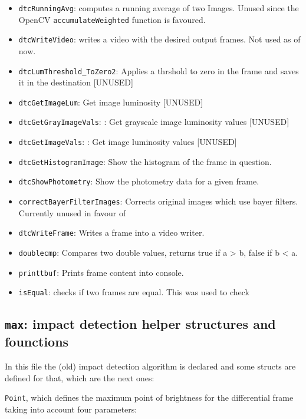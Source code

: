 \documentclass[a4paper,11pt]{memoir}
\begin{document}
\begin{itemize}
\begin{itemize}
\end{itemize}
\item \texttt{dtcRunningAvg}: computes a running average of two Images. Unused since the OpenCV \texttt{accumulateWeighted} function is favoured.
\item \texttt{dtcWriteVideo}: writes a video with the desired output frames. Not used as of now.
\item \texttt{dtcLumThreshold\_ToZero2}: Applies a thrshold to zero in the frame and saves it in
the destination [UNUSED]
\item \texttt{dtcGetImageLum}: Get image luminosity [UNUSED]
\item \texttt{dtcGetGrayImageVals}: : Get grayscale image luminosity values [UNUSED]
\item \texttt{dtcGetImageVals}: : Get image luminosity values [UNUSED]
\item \texttt{dtcGetHistogramImage}: Show the histogram of the frame in question.
\item \texttt{dtcShowPhotometry}: Show the photometry data for a given frame.
\item \texttt{correctBayerFilterImages}: Corrects original images which use bayer filters.
Currently unused in favour of
\item \texttt{dtcWriteFrame}: Writes a frame into a video writer.
\item \texttt{doublecmp}: Compares two double values, returns true if a > b, false if b < a.
\item \texttt{printtbuf}: Prints frame content into console.
\item \texttt{isEqual}: checks if two frames are equal. This was used to check
\end{itemize}

\subsection{\texttt{max}: impact detection helper structures and founctions}

In this file the (old) impact detection algorithm is declared and some structs are defined for that, which are the next ones:

\texttt{Point}, which defines the maximum point of brightness for the differential frame taking into account four parameters:
\end{document}
